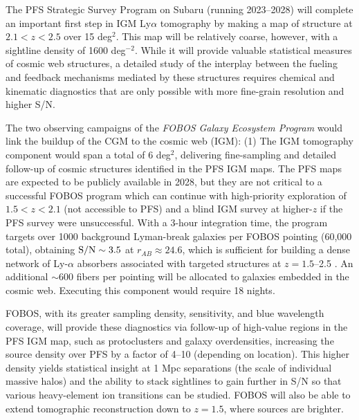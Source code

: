 \documentclass[11pt,a4paper,twoside,onecolumn,openany,final,oldfontcommands]{memoir}
\begin{document}

The PFS Strategic Survey Program on Subaru (running 2023--2028) will complete an important first step in IGM Ly$\alpha$ tomography by making a map of structure at $2.1 < z < 2.5$ over 15 deg$^2$.  This map will be relatively coarse, however, with a sightline density of 1600 deg$^{-2}$.  While it will provide valuable statistical measures of cosmic web structures, a detailed study of the interplay between the fueling and feedback mechanisms mediated by these structures requires chemical and kinematic diagnostics that are only possible with more fine-grain resolution and higher S/N.

The two observing campaigns of the \textit{FOBOS Galaxy Ecosystem Program} would link the buildup of the CGM to the cosmic web (IGM): (1) The IGM tomography component would span a total of 6 deg$^2$, delivering fine-sampling and detailed follow-up of cosmic structures identified in the PFS IGM maps.  The PFS maps are expected to be publicly available in 2028, but they are not critical to a successful FOBOS program which can continue with high-priority exploration of $1.5 < z < 2.1$ (not accessible to PFS) and a blind IGM survey at higher-$z$ if the PFS survey were unsuccessful.  With a 3-hour integration time, the program targets over 1000 background Lyman-break galaxies per FOBOS pointing (60,000 total), obtaining ${\rm S/N} \sim 3.5$ at $r_{AB} \approx 24.6$, which is sufficient for building a dense network of Ly-$\alpha$ absorbers associated with targeted structures at $z = 1.5$--2.5 \citep[see][]{lee16}. An additional $\sim$600 fibers per pointing will be allocated to galaxies embedded in the cosmic web. Executing this component would require 18 nights.  

FOBOS, with its greater sampling density, sensitivity, and blue wavelength coverage, will provide these diagnostics via follow-up of high-value regions in the PFS IGM map, such as protoclusters and galaxy overdensities, increasing the source density over PFS by a factor of 4--10 (depending on location).  This higher density yields statistical insight at 1 Mpc separations (the scale of individual massive halos) and the ability to stack sightlines to gain further in S/N so that various heavy-element ion transitions can be studied.  FOBOS will also be able to extend tomographic reconstruction down to $z = 1.5$, where sources are brighter.
\end{document}
